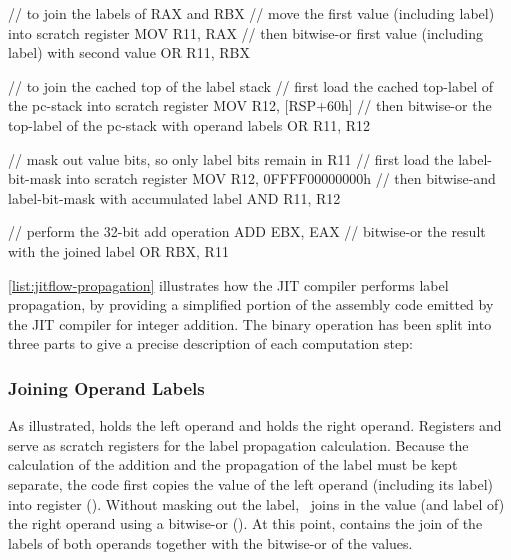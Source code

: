 \begin{asmcode}
// to join the labels of RAX and RBX
// move the first value (including label) into scratch register
MOV R11, RAX
// then bitwise-or first value (including label) with second value
OR  R11, RBX

// to join the cached top of the label stack
// first load the cached top-label of the pc-stack into scratch register
MOV R12, [RSP+60h]
// then bitwise-or the top-label of the pc-stack with operand labels
OR  R11, R12

// mask out value bits, so only label bits remain in R11
// first load the label-bit-mask into scratch register
MOV R12, 0FFFF00000000h
// then bitwise-and label-bit-mask with accumulated label
AND R11, R12

// perform the 32-bit add operation
ADD EBX, EAX
// bitwise-or the result with the joined label
OR  RBX, R11
\end{asmcode}

\autoref{list:jitflow-propagation} illustrates how the JIT compiler performs label propagation, by providing a simplified portion of the assembly code emitted by the JIT compiler for integer addition.
The binary operation has been split into three parts to give a precise description of each computation step:

\subsubsection{Joining Operand Labels}

As illustrated,  holds the left operand and  holds the right operand.
Registers  and  serve as scratch registers for the label propagation calculation.
Because the calculation of the addition and the propagation of the label must be kept separate, the code first copies the value of the left operand (including its label) into register  ().
Without masking out the label, \JitFlow\ joins in the value (and label of) the right operand using a bitwise-or ().
At this point,  contains the join of the labels of both operands together with the bitwise-or of the values.

